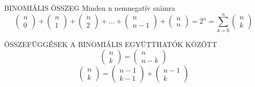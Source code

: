 \begin{tetel}{BINOMIÁLIS ÖSSZEG}
Minden n nemnegatív számra
$$\begin{pmatrix}
n\\0
\end{pmatrix} + \begin{pmatrix}
n\\1
\end{pmatrix} + \begin{pmatrix}
n\\2
\end{pmatrix} + ... + \begin{pmatrix}
n\\n-1
\end{pmatrix} + \begin{pmatrix}
n\\n
\end{pmatrix} = 2^n = \sum_{k = 0}^{n}\begin{pmatrix}
n\\k
\end{pmatrix}$$
\end{tetel}

\begin{tetel}{ÖSSZEFÜGGÉSEK A BINOMIÁLIS EGYÜTTHATÓK KÖZÖTT}
$$
\begin{pmatrix}
n\\k
\end{pmatrix} = \begin{pmatrix}
n\\n-k
\end{pmatrix}
$$
$$
\begin{pmatrix}
n\\k
\end{pmatrix} = \begin{pmatrix}
n-1\\k-1
\end{pmatrix} + \begin{pmatrix}
n-1\\k
\end{pmatrix}
$$
\end{tetel}
